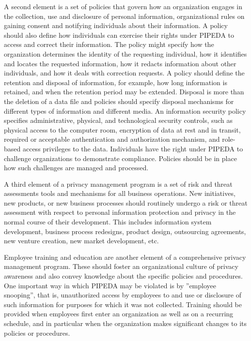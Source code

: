 A second element is a set of policies that govern how an organization engages in the collection, use and disclosure of personal information, organizational rules on gaining consent and notifying individuals about their information. A policy should also define how individuals can exercise their rights under PIPEDA to access and correct their information. The policy might specify how the organization determines the identity of the requesting individual, how it identifies and locates the requested information, how it redacts information about other individuals, and how it deals with correction requests. A policy should define the retention and disposal of information, for example, how long information is retained, and when the retention period may be extended. Disposal is more than the deletion of a data file and policies should specify disposal mechanisms for different types of information and different media. An information security policy specifies administrative, physical, and technological security controls, such as physical access to the computer room, encryption of data at rest and in transit, required or acceptable authentication and authorization mechanism, and role-based access privileges to the data. Individuals have the right under PIPEDA to challenge organizations to demonstrate compliance. Policies should be in place how such challenges are managed and processed.

A third element of a privacy management program is a set of risk and threat assessments tools and mechanisms for all business operations. New initiatives, new products, or new business processes should routinely undergo a risk or threat assessment with respect to personal information protection and privacy in the normal course of their development. This includes information system development, business process redesigns, product design, outsourcing agreements, new venture creation, new market development, etc. 

Employee training and education are another element of a comprehensive privacy management program. These should foster an organizational culture of privacy awareness and also convey knowledge about the specific policies and procedures. One important way in which PIPEDA may be violated is by ''employee snooping'', that is, unauthorized access by employees to and use or disclosure of such information for purposes for which it was not collected. Training should be provided when employees first enter an organization as well as on a recurring schedule, and in particular when the organization makes significant changes to its policies or procedures. 

